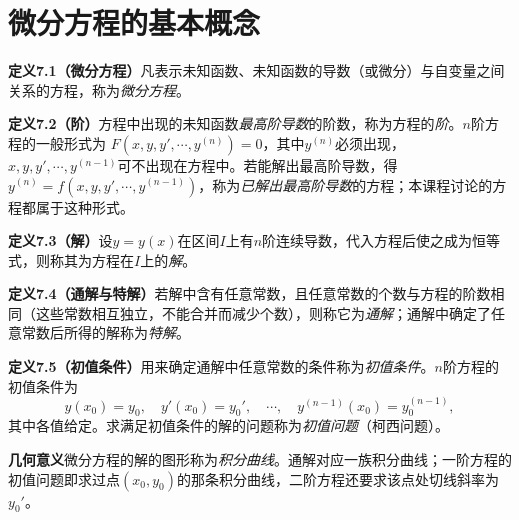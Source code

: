 
\section{微分方程的基本概念}

\noindent\textbf{定义7.1（微分方程）}\quad 凡表示未知函数、未知函数的导数（或微分）与自变量之间关系的方程，称为\emph{微分方程}。

\noindent\textbf{定义7.2（阶）}\quad 方程中出现的未知函数\emph{最高阶导数}的阶数，称为方程的\emph{阶}。$n$阶方程的一般形式为
$F(x,y,y',\cdots,y^{(n)})=0$，其中$y^{(n)}$必须出现，$x,y,y',\cdots,y^{(n-1)}$可不出现在方程中。若能解出最高阶导数，得$y^{(n)}=f(x,y,y',\cdots,y^{(n-1)})$，称为\emph{已解出最高阶导数}的方程；本课程讨论的方程都属于这种形式。

\noindent\textbf{定义7.3（解）}\quad 设$y=y(x)$在区间$I$上有$n$阶连续导数，代入方程后使之成为恒等式，则称其为方程在$I$上的\emph{解}。

\noindent\textbf{定义7.4（通解与特解）}\quad 若解中含有任意常数，且任意常数的个数与方程的阶数相同（这些常数相互独立，不能合并而减少个数），则称它为\emph{通解}；通解中确定了任意常数后所得的解称为\emph{特解}。

\noindent\textbf{定义7.5（初值条件）}\quad 用来确定通解中任意常数的条件称为\emph{初值条件}。$n$阶方程的初值条件为
\[
y(x_0)=y_0,\quad y'(x_0)=y_0',\quad\cdots,\quad y^{(n-1)}(x_0)=y_0^{(n-1)},
\]
其中各值给定。求满足初值条件的解的问题称为\emph{初值问题}（柯西问题）。

\noindent\textbf{几何意义}\quad 微分方程的解的图形称为\emph{积分曲线}。通解对应一族积分曲线；一阶方程的初值问题即求过点$(x_0,y_0)$的那条积分曲线，二阶方程还要求该点处切线斜率为$y_0'$。



